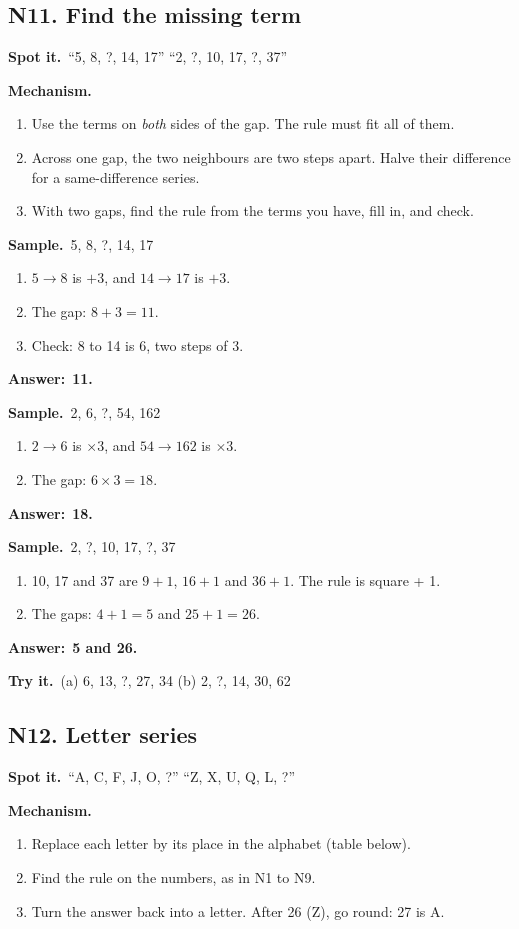 \documentclass[11pt,a4paper]{article}
\let\oldsubsection\subsection
\renewcommand{\subsection}{\needspace{9\baselineskip}\oldsubsection}
\newcommand{\spot}{\textbf{\color{ember}Spot it.}\ }
\newcommand{\mech}{\textbf{\color{ember}Mechanism.}\ }
\newif\ifkeepsamp
\newcommand{\ans}[1]{\par\nopagebreak\noindent\textbf{\color{ember}Answer:}\ \textbf{#1}\par}
\newcommand{\samp}{\ifkeepsamp\needspace{4\baselineskip}\fi\textbf{\color{ember}Sample.}\ }
\newcommand{\tryit}[1]{\textbf{\color{ember}Try it.}\ #1}
\begin{document}
\subsection{N11. Find the missing term}
\spot ``5, 8, ?, 14, 17'' ``2, ?, 10, 17, ?, 37''

\mech
\begin{enumerate}
\item Use the terms on \emph{both} sides of the gap. The rule must fit all of them.
\item Across one gap, the two neighbours are two steps apart. Halve their difference for a same-difference series.
\item With two gaps, find the rule from the terms you have, fill in, and check.
\end{enumerate}

\samp 5, 8, ?, 14, 17
\begin{enumerate}
\item $5 \to 8$ is $+3$, and $14 \to 17$ is $+3$.
\item The gap: $8 + 3 = 11$.
\item Check: 8 to 14 is 6, two steps of 3.
\end{enumerate}
\ans{11.}

\samp 2, 6, ?, 54, 162
\begin{enumerate}
\item $2 \to 6$ is $\times 3$, and $54 \to 162$ is $\times 3$.
\item The gap: $6 \times 3 = 18$.
\end{enumerate}
\ans{18.}

\samp 2, ?, 10, 17, ?, 37
\begin{enumerate}
\item 10, 17 and 37 are $9 + 1$, $16 + 1$ and $36 + 1$. The rule is square + 1.
\item The gaps: $4 + 1 = 5$ and $25 + 1 = 26$.
\end{enumerate}
\ans{5 and 26.}

\tryit (a) 6, 13, ?, 27, 34 (b) 2, ?, 14, 30, 62

\subsection{N12. Letter series}
\spot ``A, C, F, J, O, ?'' ``Z, X, U, Q, L, ?''

\mech
\begin{enumerate}
\item Replace each letter by its place in the alphabet (table below).
\item Find the rule on the numbers, as in N1 to N9.
\item Turn the answer back into a letter. After 26 (Z), go round: 27 is A.
\end{enumerate}
\end{document}
